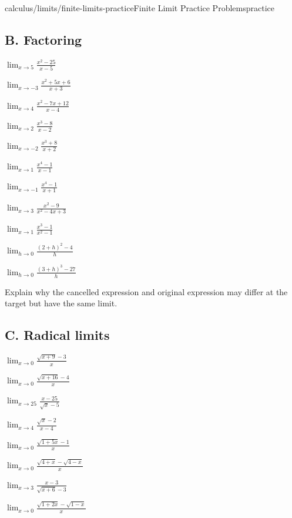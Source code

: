 \documentclass[11pt,openany]{book}
\theoremstyle{bgplain}
\begin{document}
\begin{webpage}{calculus/limits/finite-limits-practice}{Finite Limit Practice Problems}{practice}
\subsection*{B. Factoring}
\begin{bgexercises}[label=\textbf{2.\arabic*},resume]
  \item \(\displaystyle\lim_{x\to5}\frac{x^2-25}{x-5}\)
  \item \(\displaystyle\lim_{x\to-3}\frac{x^2+5x+6}{x+3}\)
  \item \(\displaystyle\lim_{x\to4}\frac{x^2-7x+12}{x-4}\)
  \item \(\displaystyle\lim_{x\to2}\frac{x^3-8}{x-2}\)
  \item \(\displaystyle\lim_{x\to-2}\frac{x^3+8}{x+2}\)
  \item \(\displaystyle\lim_{x\to1}\frac{x^4-1}{x-1}\)
  \item \(\displaystyle\lim_{x\to-1}\frac{x^4-1}{x+1}\)
  \item \(\displaystyle\lim_{x\to3}\frac{x^2-9}{x^2-4x+3}\)
  \item \(\displaystyle\lim_{x\to1}\frac{x^3-1}{x^2-1}\)
  \item \(\displaystyle\lim_{h\to0}\frac{(2+h)^2-4}{h}\)
  \item \(\displaystyle\lim_{h\to0}\frac{(3+h)^3-27}{h}\)
  \item Explain why the cancelled expression and original expression may differ at the target but have the same limit.
\end{bgexercises}

\subsection*{C. Radical limits}
\begin{bgexercises}[label=\textbf{2.\arabic*},resume]
  \item \(\displaystyle\lim_{x\to0}\frac{\sqrt{x+9}-3}{x}\)
  \item \(\displaystyle\lim_{x\to0}\frac{\sqrt{x+16}-4}{x}\)
  \item \(\displaystyle\lim_{x\to25}\frac{x-25}{\sqrt{x}-5}\)
  \item \(\displaystyle\lim_{x\to4}\frac{\sqrt{x}-2}{x-4}\)
  \item \(\displaystyle\lim_{x\to0}\frac{\sqrt{1+5x}-1}{x}\)
  \item \(\displaystyle\lim_{x\to0}\frac{\sqrt{4+x}-\sqrt{4-x}}{x}\)
  \item \(\displaystyle\lim_{x\to3}\frac{x-3}{\sqrt{x+6}-3}\)
  \item \(\displaystyle\lim_{x\to0}\frac{\sqrt{1+2x}-\sqrt{1-x}}{x}\)
\end{bgexercises}


\end{webpage}
\end{document}
